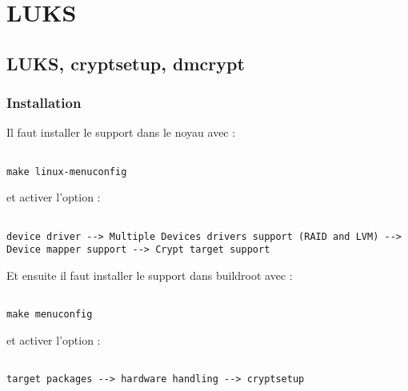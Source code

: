 
\chapter{LUKS} %

\label{Chapitre 6.1} %




\section{LUKS, cryptsetup, dmcrypt}
\subsection{Installation}

Il faut installer le support dans le noyau avec : 
\begin{lstlisting}[frame=single,style=Console]  % Start your code-block

make linux-menuconfig
\end{lstlisting}

et activer l'option : 
\begin{lstlisting}[frame=single,style=Console]  % Start your code-block

device driver --> Multiple Devices drivers support (RAID and LVM) --> Device mapper support --> Crypt target support
\end{lstlisting}

Et ensuite il faut installer le support dans buildroot avec : 
\begin{lstlisting}[frame=single,style=Console]  % Start your code-block

make menuconfig
\end{lstlisting}

et activer l'option : 
\begin{lstlisting}[frame=single,style=Console]  % Start your code-block

target packages --> hardware handling --> cryptsetup
\end{lstlisting}\\

